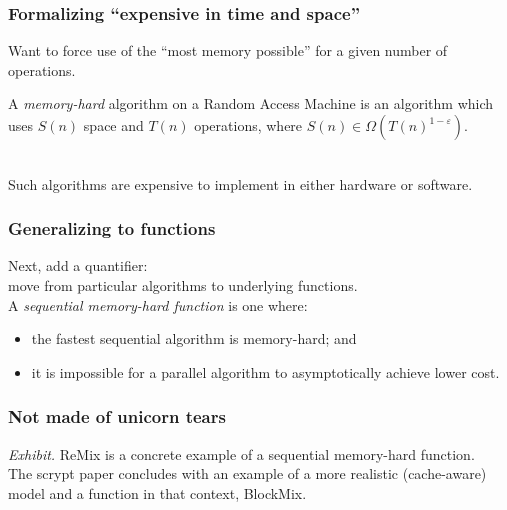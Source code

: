 \begin{frame}
  \frametitle{Formalizing ``expensive in time and space''}
  
    Want to force use of the ``most memory possible'' for a given
    number of operations.\\[1em]
  
    \begin{defn}
      A \emph{memory-hard} algorithm on a Random Access Machine is an
      algorithm which uses $S(n)$ space and $T(n)$ operations, where
      $S(n) \in \Omega(T(n)^{1-\varepsilon})$.
    \end{defn}~\\
    
      Such algorithms are expensive to implement in either hardware or software.
    

\end{frame}

\begin{frame}
  \frametitle{Generalizing to functions}
  
    Next, add a quantifier: \\move from particular algorithms to underlying functions.\\[1em]
    A \emph{sequential memory-hard function} is one where:

    \begin{itemize}
      \item the fastest
        sequential algorithm is memory-hard; and
      \item it is impossible for a
        parallel algorithm to asymptotically achieve lower cost.
    \end{itemize}
  
\end{frame}

\begin{frame}
  \frametitle{Not made of unicorn tears}
  
    \emph{Exhibit.} ReMix is a concrete example of a sequential memory-hard function.\\[1em]
    The scrypt paper concludes with an example of a more realistic (cache-aware) model and
    a function in that context, BlockMix.
  
\end{frame}



